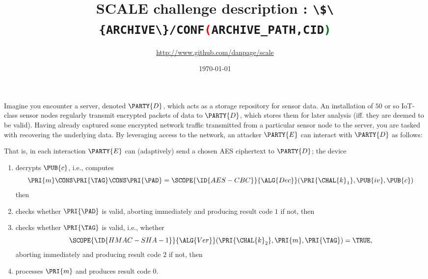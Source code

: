 \documentclass[crop={false},multi={true},tikz={true}]{standalone}
\begin{document}

\ifstandalone
\author{\url{http://www.github.com/danpage/scale}}
\title{\Large SCALE challenge description : \lstinline[language={bash}]|\$\{ARCHIVE\}/CONF(ARCHIVE_PATH,CID)|}
\date{\today}

\maketitle
\fi



Imagine you encounter a server, denoted $\PARTY{D}$, 
which acts as a storage repository for sensor data.  An installation of $50$ 
or so IoT-class sensor nodes regularly transmit encrypted packets of data to
$\PARTY{D}$, which stores them for later analysis (iff. they are deemed to be
valid).  Having already captured some encrypted network traffic transmitted 
from a particular sensor node to the server, you are tasked with recovering 
the underlying data.
By leveraging access to the network, 
an attacker $\PARTY{E}$ can interact with $\PARTY{D}$ as follows:

\begin{center}

\end{center}

\noindent
That is, in each interaction $\PARTY{E}$ can (adaptively) send 
a chosen AES ciphertext
to $\PARTY{D}$; the device

\begin{enumerate}
\item decrypts $\PUB{c}$, i.e., computes
      \[
      \PRI{m} \CONS \PRI{\TAG} \CONS \PRI{\PAD} = \SCOPE{\ID{AES-CBC}}{\ALG{Dec}}( \PRI{\CHAL{k}_1}, \PUB{iv}, \PUB{c} )
      \]
      then
\item checks whether $\PRI{\PAD}$ is valid, 
      aborting immediately  and producing result code $1$ if not,
      then
\item checks whether $\PRI{\TAG}$ is valid, i.e., whether 
      \[
      \SCOPE{\ID{HMAC-SHA-1}}{\ALG{Ver}}( \PRI{\CHAL{k}_2}, \PRI{m}, \PRI{\TAG} ) = \TRUE ,
      \]
      aborting immediately  and producing result code $2$ if not,
      then
\item processes $\PRI{m}$
                            and produces  result code $0$.
\end{enumerate}
\end{document}

